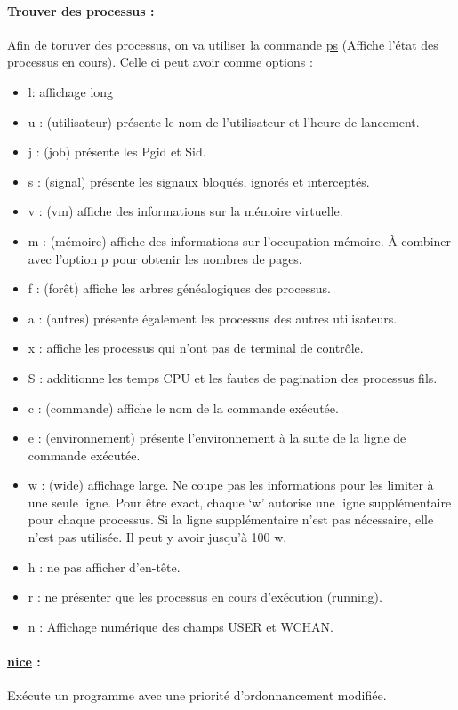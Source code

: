 \documentclass{article}[12pt]
\begin{document}
\paragraph{Trouver des processus : } Afin de toruver des processus, on va utiliser la commande \href{http://jp.barralis.com/linux-man/result.php#rech}{ps} (Affiche l'état des processus en cours). Celle ci peut avoir comme options : 
\begin{itemize}
\item l: affichage long
\item u : (utilisateur) présente le nom de l'utilisateur et l'heure de lancement.
\item j : (job) présente les Pgid et Sid.
\item s : (signal) présente les signaux bloqués, ignorés et interceptés.
\item v : (vm) affiche des informations sur la mémoire virtuelle.
\item m : (mémoire) affiche des informations sur l'occupation mémoire. À combiner avec l'option p pour obtenir les nombres de pages.
\item f : (forêt) affiche les arbres généalogiques des processus.
\item a : (autres) présente également les processus des autres utilisateurs.
\item x : affiche les processus qui n'ont pas de terminal de contrôle.
\item S : additionne les temps CPU et les fautes de pagination des processus fils.
\item c : (commande) affiche le nom de la commande exécutée.
\item e : (environnement) présente l'environnement à la suite de la ligne de commande exécutée.
\item w : (wide) affichage large. Ne coupe pas les informations pour les limiter à une seule ligne. Pour être exact, chaque `w' autorise une ligne supplémentaire pour chaque processus. Si la ligne supplémentaire n'est pas nécessaire, elle n'est pas utilisée. Il peut y avoir jusqu'à 100 w.
\item h : ne pas afficher d'en-tête.
\item r : ne présenter que les processus en cours d'exécution (running).
\item n : Affichage numérique des champs USER et WCHAN.
\end{itemize}
\paragraph{\href{http://jp.barralis.com/linux-man/man1/nice.1.php}{nice} : } Exécute un programme avec une priorité d'ordonnancement modifiée.  
\end{document}
